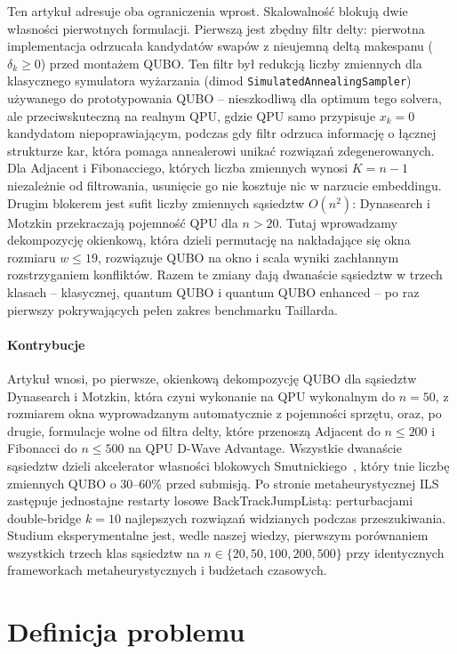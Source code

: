 \documentclass[11pt,a4paper]{article}
\begin{document}
Ten artykuł adresuje oba ograniczenia wprost. Skalowalność blokują dwie
własności pierwotnych formulacji. Pierwszą jest zbędny filtr delty:
pierwotna implementacja odrzucała kandydatów swapów z nieujemną deltą
makespanu ($\delta_k\ge0$) przed montażem QUBO. Ten filtr był redukcją
liczby zmiennych dla klasycznego symulatora wyżarzania (dimod
\texttt{SimulatedAnnealingSampler}) używanego do prototypowania QUBO
-- nieszkodliwą dla optimum tego solvera, ale przeciwskuteczną na
realnym QPU, gdzie QPU samo przypisuje $x_k=0$ kandydatom
niepoprawiającym, podczas gdy filtr odrzuca informację o łącznej
strukturze kar, która pomaga annealerowi unikać rozwiązań
zdegenerowanych. Dla Adjacent i Fibonacciego, których
liczba zmiennych wynosi $K=n-1$ niezależnie od filtrowania, usunięcie go
nie kosztuje nic w narzucie embeddingu. Drugim blokerem jest sufit
liczby zmiennych sąsiedztw $O(n^2)$: Dynasearch i Motzkin przekraczają
pojemność QPU dla $n>20$. Tutaj wprowadzamy dekompozycję okienkową,
która dzieli permutację na nakładające się okna rozmiaru $w\le19$,
rozwiązuje QUBO na okno i scala wyniki zachłannym rozstrzyganiem
konfliktów. Razem te zmiany dają dwanaście sąsiedztw w trzech klasach
-- klasycznej, quantum QUBO i quantum QUBO enhanced -- po raz pierwszy
pokrywających pełen zakres benchmarku Taillarda.

\paragraph{Kontrybucje}
Artykuł wnosi, po pierwsze, okienkową dekompozycję QUBO dla sąsiedztw
Dynasearch i Motzkin, która czyni wykonanie na QPU wykonalnym do
$n=50$, z rozmiarem okna wyprowadzanym automatycznie z pojemności
sprzętu, oraz, po drugie, formulacje wolne od filtra delty, które
przenoszą Adjacent do $n\le200$ i Fibonacci do $n\le500$ na QPU D-Wave
Advantage. Wszystkie dwanaście sąsiedztw dzieli akcelerator własności
blokowych Smutnickiego~\citep{ref_smutnicki}, który tnie liczbę
zmiennych QUBO o 30--60\% przed submisją. Po stronie metaheurystycznej
ILS zastępuje jednostajne restarty losowe BackTrackJumpListą:
perturbacjami double-bridge $k=10$ najlepszych rozwiązań widzianych
podczas przeszukiwania. Studium eksperymentalne jest, wedle naszej
wiedzy, pierwszym porównaniem wszystkich trzech klas sąsiedztw na
$n\in\{20,50,100,200,500\}$ przy identycznych frameworkach
metaheurystycznych i budżetach czasowych.

\section{Definicja problemu}
\label{sec:problem}
\end{document}
